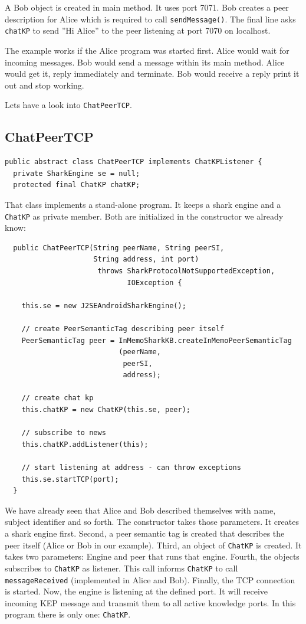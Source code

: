{A Bob object is created in main method. It uses port 7071. Bob creates a peer description for Alice which is required to call {\tt sendMessage()}. The final line asks {\tt chatKP} to send ''Hi Alice'' to the peer listening at port 7070 on localhost.

The example works if the Alice program was started first. Alice would wait for incoming messages. Bob would send a message within its main method. Alice would get it, reply immediately and terminate. Bob would receive a reply print it out and stop working.

Lets have a look into {\tt ChatPeerTCP}.

\subsection{ChatPeerTCP}
\begin{verbatim}
public abstract class ChatPeerTCP implements ChatKPListener {
  private SharkEngine se = null;
  protected final ChatKP chatKP;
\end{verbatim}

That class implements a stand-alone program. It keeps a shark engine
and a {\tt ChatKP} as private member. Both are initialized in the
constructor we already know:

\begin{verbatim}
  public ChatPeerTCP(String peerName, String peerSI,
                     String address, int port)
                      throws SharkProtocolNotSupportedException,
                             IOException {

    this.se = new J2SEAndroidSharkEngine();

    // create PeerSemanticTag describing peer itself
    PeerSemanticTag peer = InMemoSharkKB.createInMemoPeerSemanticTag
                           (peerName,
                            peerSI,
                            address);

    // create chat kp
    this.chatKP = new ChatKP(this.se, peer);

    // subscribe to news
    this.chatKP.addListener(this);

    // start listening at address - can throw exceptions
    this.se.startTCP(port);
  }
\end{verbatim}
We have already seen that Alice and Bob described themselves with
name, subject identifier and so forth. The constructor takes those parameters.
It creates a shark engine first. Second, a peer semantic tag is created that describes the peer itself (Alice or Bob in our example). Third, an object of
{\tt ChatKP} is created. It takes two parameters: Engine and peer that runs that
engine. Fourth, the objects subscribes to {\tt ChatKP} as listener. This call informs {\tt ChatKP} to call {\tt messageReceived} (implemented in Alice and
Bob). Finally, the TCP connection is started. Now, the engine is listening at the defined port. It will receive incoming KEP message and transmit them to all active knowledge ports. In this program there is only one: {\tt ChatKP}.

}
